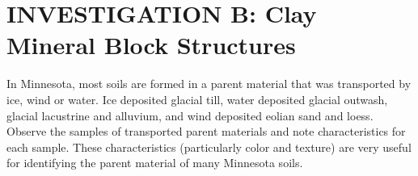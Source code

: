 \documentclass[
  letterpaper,
  twocolumn,
  portrait]{scrbook}
\begin{document}
\hypertarget{investigation-b-clay-mineral-block-structures-1}{%
\section{INVESTIGATION B: Clay Mineral Block
Structures}\label{investigation-b-clay-mineral-block-structures-1}}

In Minnesota, most soils are formed in a parent material that was
transported by ice, wind or water. Ice deposited glacial till, water
deposited glacial outwash, glacial lacustrine and alluvium, and wind
deposited eolian sand and loess. Observe the samples of transported
parent materials and note characteristics for each sample. These
characteristics (particularly color and texture) are very useful for
identifying the parent material of many Minnesota soils.

 
  \providecommand{\huxb}[2]{\arrayrulecolor[RGB]{#1}\global\arrayrulewidth=#2pt}
  \providecommand{\huxvb}[2]{\color[RGB]{#1}\vrule width #2pt}
  \providecommand{\huxtpad}[1]{\rule{0pt}{#1}}
  \providecommand{\huxbpad}[1]{\rule[-#1]{0pt}{#1}}
\end{document}
